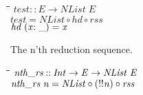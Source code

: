 \documentclass{article}
\newlength{\lwidth}\setlength{\lwidth}{4.5cm}
\newlength{\cwidth}\setlength{\cwidth}{8mm} %
\newcommand{\Conid}[1]{\mathit{#1}}
\newcommand{\Varid}[1]{\mathit{#1}}
\begin{document}
\begin{tabbing}
\qquad\=\hspace{\lwidth}\=\hspace{\cwidth}\=\+\kill
${\Varid{test}\mathbin{::}\Conid{E}\to \Conid{NList}\;\Conid{E}}$\\
${\Varid{test}\mathrel{=}\Conid{NList}\mathbin{\circ}\Varid{hd}\mathbin{\circ}\Varid{rss}}$\\
${\Varid{hd}\;(\Varid{x}\mathbin{:\char95 })\mathrel{=}\Varid{x}}$
\end{tabbing}

The n'th reduction sequence.

\begin{tabbing}
\qquad\=\hspace{\lwidth}\=\hspace{\cwidth}\=\+\kill
${\Varid{nth\char95 rs}\mathbin{::}\Conid{Int}\to \Conid{E}\to \Conid{NList}\;\Conid{E}}$\\
${\Varid{nth\char95 rs}\;\Varid{n}\mathrel{=}\Conid{NList}\mathbin{\circ}(\mathbin{!!}\Varid{n})\mathbin{\circ}\Varid{rss}}$
\end{tabbing}
\end{document}
